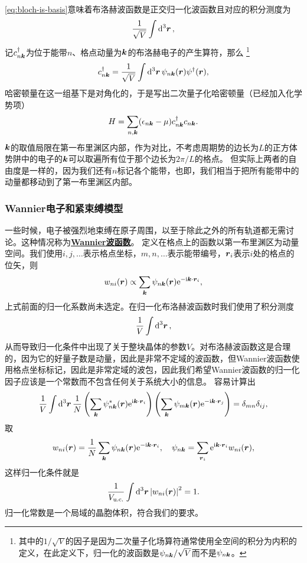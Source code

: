 \documentclass[hyperref, UTF8, a4paper]{ctexart}
\newcommand*{\ii}{\mathrm{i}}
\newcommand*{\ee}{\mathrm{e}}
\newcommand*{\concept}[1]{\underline{\textbf{#1}}}
\begin{document}
\eqref{eq:bloch-is-basis}意味着布洛赫波函数是正交归一化波函数且对应的积分测度为
\[
    \frac{1}{\sqrt{V}} \int \dd[3]{\vb*{r}},
\]
记${c}_{n\vb*{k}}^\dagger$为位于能带$n$、格点动量为$\vb*{k}$的布洛赫电子的产生算符，那么%
\footnote{其中的$1/\sqrt{V}$的因子是因为二次量子化场算符通常使用全空间的积分为内积的定义，在此定义下，归一化的波函数是$\psi_{n\vb*{k}} / \sqrt{V}$而不是$\psi_{n\vb*{k}}$。}%
\begin{equation}
    {c}_{n \vb*{k}}^\dagger = \frac{1}{\sqrt{V}} \int \dd[3]{\vb*{r}} \psi_{n \vb*{k}}(\vb*{r}) {\psi}^\dagger(\vb*{r}),
\end{equation}
哈密顿量在这一组基下是对角化的，于是写出二次量子化哈密顿量（已经加入化学势项）
\begin{equation}
    {H} = \sum_{n, \vb*{k}} (\epsilon_{n\vb*{k}} - \mu) {c}^\dagger_{n\vb*{k}} {c}_{n\vb*{k}}.
    \label{eq:bloch-band-hamiltonian}
\end{equation}
$\vb*{k}$的取值局限在第一布里渊区内部，作为对比，不考虑周期势的边长为$L$的正方体势阱中的电子的$\vb*{k}$可以取遍所有位于那个边长为$2\pi / L$的格点。
但实际上两者的自由度是一样的，因为我们还有$n$标记各个能带，也即，我们相当于把所有能带中的动量都移动到了第一布里渊区内部。

\subsubsection{Wannier电子和紧束缚模型}

一些时候，电子被强烈地束缚在原子周围，以至于除此之外的所有轨道都无需讨论。这种情况称为\concept{Wannier波函数}。
定义在格点上的函数以第一布里渊区为动量空间。我们使用$i, j, \ldots$表示格点坐标，$m, n, \ldots$表示能带编号，$\vb*{r}_i$表示$i$处的格点的位矢，则
\[
    w_{ni}(\vb*{r}) \propto \sum_{\vb*{k}} \psi_{n\vb*{k}}(\vb*{r}) \ee^{- \ii \vb*{k} \cdot \vb*{r}_i},
\]
上式前面的归一化系数尚未选定。在归一化布洛赫波函数时我们使用了积分测度
\[
    \frac{1}{V} \int \dd[3]{\vb*{r}},
\]
从而导致归一化条件中出现了关于整块晶体的参数$V$。对布洛赫波函数这是合理的，因为它的好量子数是动量，因此是非常不定域的波函数，但Wannier波函数使用格点坐标标记，因此是非常定域的波包，因此我们希望Wannier波函数的归一化因子应该是一个常数而不包含任何关于系统大小的信息。
容易计算出
\[
    \frac{1}{V} \int \dd[3]{\vb*{r}} \frac{1}{N} \left( \sum_{\vb*{k}} \psi^*_{n\vb*{k}}(\vb*{r}) \ee^{\ii \vb*{k} \cdot \vb*{r}_i} \right) \left( \sum_{\vb*{k}} \psi_{m\vb*{k}}(\vb*{r}) \ee^{- \ii \vb*{k} \cdot \vb*{r}_j} \right) = \delta_{mn} \delta_{ij},
\]
取
\begin{equation}
    w_{ni}(\vb*{r}) = \frac{1}{N} \sum_{\vb*{k}} \psi_{n\vb*{k}}(\vb*{r}) \ee^{-\ii \vb*{k} \cdot \vb*{r}_i}, \quad \psi_{n\vb*{k}} = \sum_{\vb*{r}_i} \ee^{\ii \vb*{k} \cdot \vb*{r}_i} w_{ni}(\vb*{r}),
\end{equation}
这样归一化条件就是
\begin{equation}
    \frac{1}{V_\text{u.c.}} \int \dd[3]{\vb*{r}} \abs{w_{ni}(\vb*{r})}^2 = 1.
\end{equation}
归一化常数是一个局域的晶胞体积，符合我们的要求。
\end{document}
